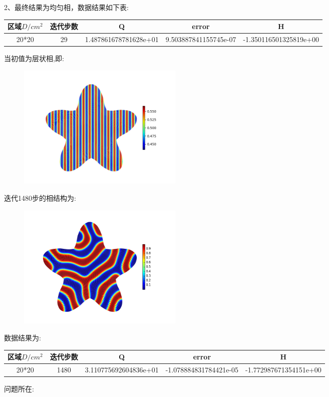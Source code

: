 \documentclass[12pt]{article}
\begin{document}
\begin{CJK}{UTF8}{gkai}
     
2、最终结果为均匀相，数据结果如下表:\\
\begin{table}[H]
	\centering
\begin{tabular}{ccccc}
	\toprule
	区域$D/cm^2$ &	迭代步数 & Q&error &  H \\
	\midrule
	20*20&29& 1.487861678781628e+01& 9.503887841155745e-07& -1.350116501325819e+00\\
	\bottomrule
\end{tabular}
\end{table}
当初值为层状相,即:\\
\begin{figure}[H]
	\centering
	\includegraphics[width=8cm]{0.png}
	\caption{}  		
\end{figure}
迭代1480步的相结构为:\\
\begin{figure}[H]
	\centering   
	\includegraphics[width=8cm]{scftfigure1558.png}
	\caption{}
\end{figure}     
数据结果为:\\
\begin{table}[H]
	\centering
	\begin{tabular}{ccccc}
		\toprule
		区域$D/cm^2$ &	迭代步数 & Q&error &  H \\
		\midrule
		20*20&1480&3.110775692604836e+01& -1.078884831784421e-05& -1.772987671354151e+00 \\
		\bottomrule
	\end{tabular}
\end{table}    
问题所在:\\


\end{CJK}
\end{document}
